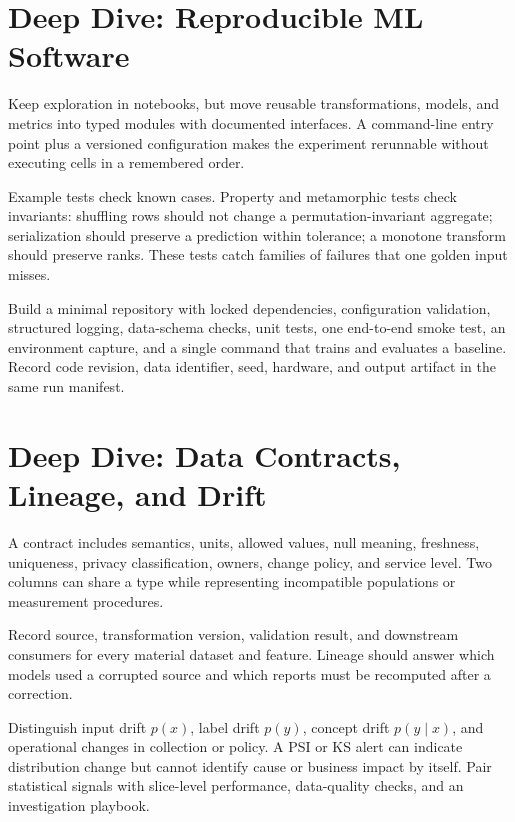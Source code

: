 \expandafter\def\csname almanachdeepdive@programming\endcsname{%
\section{Deep Dive: Reproducible ML Software}
\begin{tcbitemize}[skin=sectionraster]
\tcbitem[title={Notebook to Package},raster multicolumn=3]
Keep exploration in notebooks, but move reusable transformations, models, and
metrics into typed modules with documented interfaces.
A command-line entry point plus a versioned configuration makes the experiment
rerunnable without executing cells in a remembered order.

\tcbitem[title={Test Properties, Not Only Examples},raster multicolumn=3]
Example tests check known cases.
Property and metamorphic tests check invariants: shuffling rows should not
change a permutation-invariant aggregate; serialization should preserve a
prediction within tolerance; a monotone transform should preserve ranks.
These tests catch families of failures that one golden input misses.

\tcbitem[title={Operational Skeleton},raster multicolumn=6]
Build a minimal repository with locked dependencies, configuration validation,
structured logging, data-schema checks, unit tests, one end-to-end smoke test,
an environment capture, and a single command that trains and evaluates a
baseline.
Record code revision, data identifier, seed, hardware, and output artifact in
the same run manifest.
\end{tcbitemize}
}

\expandafter\def\csname almanachdeepdive@data-analytics\endcsname{%
\section{Deep Dive: Data Contracts, Lineage, and Drift}
\begin{tcbitemize}[skin=sectionraster]
\tcbitem[title={A Schema Is Not a Data Contract},raster multicolumn=3]
A contract includes semantics, units, allowed values, null meaning, freshness,
uniqueness, privacy classification, owners, change policy, and service level.
Two columns can share a type while representing incompatible populations or
measurement procedures.

\tcbitem[title={Lineage Makes Errors Reversible},raster multicolumn=3]
Record source, transformation version, validation result, and downstream
consumers for every material dataset and feature.
Lineage should answer which models used a corrupted source and which reports
must be recomputed after a correction.

\tcbitem[title={Drift Is a Question, Not One Score},raster multicolumn=6]
Distinguish input drift $p(x)$, label drift $p(y)$, concept drift $p(y\mid x)$,
and operational changes in collection or policy.
A PSI or KS alert can indicate distribution change but cannot identify cause or
business impact by itself.
Pair statistical signals with slice-level performance, data-quality checks,
and an investigation playbook.
\end{tcbitemize}
}

